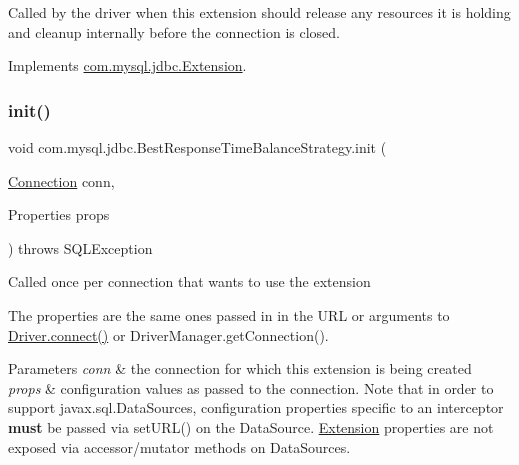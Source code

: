 Called by the driver when this extension should release any resources it is holding and cleanup internally before the connection is closed. 

Implements \mbox{\hyperlink{interfacecom_1_1mysql_1_1jdbc_1_1_extension_a7d9644de305efed5df71f3fcc7cc1772}{com.\+mysql.\+jdbc.\+Extension}}.

\mbox{\label{classcom_1_1mysql_1_1jdbc_1_1_best_response_time_balance_strategy_ac8018473ac870dfb7c67f51092cd0261}} 
\subsubsection{\texorpdfstring{init()}{init()}}
{\footnotesize\ttfamily void com.\+mysql.\+jdbc.\+Best\+Response\+Time\+Balance\+Strategy.\+init (\begin{DoxyParamCaption}\item[{\mbox{\hyperlink{interfacecom_1_1mysql_1_1jdbc_1_1_connection}{Connection}}}]{conn,  }\item[{Properties}]{props }\end{DoxyParamCaption}) throws S\+Q\+L\+Exception}

Called once per connection that wants to use the extension

The properties are the same ones passed in in the U\+RL or arguments to \mbox{\hyperlink{classcom_1_1mysql_1_1jdbc_1_1_non_registering_driver_a834c012e752a01d1ee435b3461bb8218}{Driver.\+connect()}} or Driver\+Manager.\+get\+Connection().


\begin{DoxyParams}{Parameters}
{\em conn} & the connection for which this extension is being created \\
\hline
{\em props} & configuration values as passed to the connection. Note that in order to support javax.\+sql.\+Data\+Sources, configuration properties specific to an interceptor {\bfseries must} be passed via set\+U\+R\+L() on the Data\+Source. \mbox{\hyperlink{interfacecom_1_1mysql_1_1jdbc_1_1_extension}{Extension}} properties are not exposed via accessor/mutator methods on Data\+Sources.\\
\hline
\end{DoxyParams}

